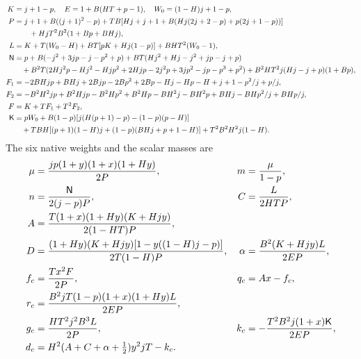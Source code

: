 \begin{align}
 K&=j+1-p,\quad E=1+B(HT+p-1),\quad W_0=(1-H)j+1-p,\notag\\
 P&=j+1+B((j+1)^2-p)
 +TB[Hj+j+1+B(Hj(2j+2-p)+p(2j+1-p))]\notag\\
 &\hspace{2em}+HjT^2B^2(1+Bp+BHj),\notag\\
 L&=K+T(W_0-H)+BT[pK+Hj(1-p)]+BHT^2(W_0-1),\notag\\
 \mathsf N&=p+B(-j^2+3jp-j-p^2+p)+BT(Hj^2+Hj-j^2+jp-j+p)\notag\\
 &\quad+B^2T(2Hj^2p-Hj^2-Hjp^2+2Hjp-2j^2p+3jp^2-jp-p^3+p^2)
       +B^2HT^2j(Hj-j+p)(1+Bp),\notag\\
 F_1&=-2BHjp+BHj+2Bjp-2Bp^2+2Bp-Hj-Hp-H+j+1-p^2/j+p/j,\notag\\
 F_2&=-B^2H^2jp+B^2Hjp-B^2Hp^2+B^2Hp-BH^2j-BH^2p
                 +BHj-BHp^2/j+BHp/j,\notag\\
 F&=K+TF_1+T^2F_2,\notag\\
 \mathsf K&=pW_0+B(1-p)[j(H(p+1)-p)-(1-p)(p-H)]\notag\\
 &\quad+TBH[(p+1)(1-H)j+(1-p)(BHj+p+1-H)]
                    +T^2B^2H^2j(1-H).
 \label{eq:polys}
\end{align}
The six native weights and the scalar masses are
\begin{align}
 \mu&=\frac{jp(1+y)(1+x)(1+Hy)}{2P},&
 m&=\frac{\mu}{1-p},\notag\\
 n&=\frac{\mathsf N}{2(j-p)P},& C&=\frac{L}{2HTP},\notag\\
 A&=\frac{T(1+x)(1+Hy)(K+Hjy)}{2(1-HT)P},\notag\\
 D&=\frac{(1+Hy)(K+Hjy)[1-y((1-H)j-p)]}{2T(1-H)P},&
 \alpha&=\frac{B^2(K+Hjy)L}{2EP},\notag\\
 f_c&=\frac{Tx^2F}{2P},& q_c&=Ax-f_c,\notag\\
 r_c&=\frac{B^2jT(1-p)(1+x)(1+Hy)L}{2EP},\notag\\
 g_c&=\frac{HT^2j^2B^3L}{2P},&
 k_c&=-\frac{T^2B^2j(1+x)\mathsf K}{2EP},\notag\\
 d_c&=H^2(A+C+\alpha+\tfrac12)y^2jT-k_c.
 \label{eq:source}
\end{align}
